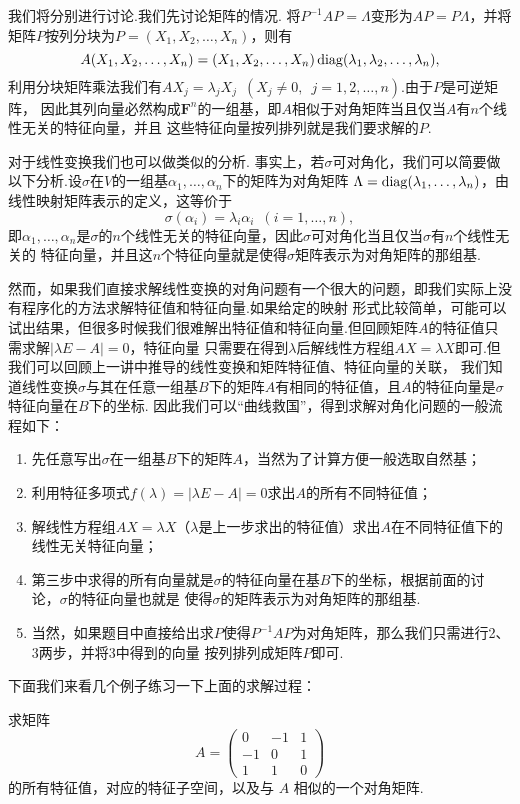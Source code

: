 我们将分别进行讨论.我们先讨论矩阵的情况.
将$P^{-1}AP=\Lambda$变形为$AP=P\Lambda$，并将矩阵$P$按列分块为$P=(X_1,X_2,\ldots,X_n)$，则有
\[A(X_1,X_2,\ldots,X_n)=(X_1,X_2,\ldots,X_n)\operatorname{diag}(\lambda_1,\lambda_2,\ldots,\lambda_n),\]
利用分块矩阵乘法我们有$AX_j=\lambda_jX_j\enspace(X_j\neq 0,\enspace j=1,2,\ldots,n)$.由于$P$是可逆矩阵，
因此其列向量必然构成$\mathbf{F}^n$的一组基，即$A$相似于对角矩阵当且仅当$A$有$n$个线性无关的特征向量，并且
这些特征向量按列排列就是我们要求解的$P$.

对于线性变换我们也可以做类似的分析.
事实上，若$\sigma$可对角化，我们可以简要做以下分析.设$\sigma$在$V$的一组基$\alpha_1,\ldots,\alpha_n$下的矩阵为对角矩阵
$\Lambda=\operatorname{diag}(\lambda_1,\ldots,\lambda_n)$，由线性映射矩阵表示的定义，这等价于
\[\sigma(\alpha_i)=\lambda_i\alpha_i\enspace(i=1,\ldots,n),\]
即$\alpha_1,\ldots,\alpha_n$是$\sigma$的$n$个线性无关的特征向量，因此$\sigma$可对角化当且仅当$\sigma$有$n$个线性无关的
特征向量，并且这$n$个特征向量就是使得$\sigma$矩阵表示为对角矩阵的那组基.

然而，如果我们直接求解线性变换的对角问题有一个很大的问题，即我们实际上没有程序化的方法求解特征值和特征向量.如果给定的映射
形式比较简单，可能可以试出结果，但很多时候我们很难解出特征值和特征向量.但回顾矩阵$A$的特征值只需求解$|\lambda E-A|=0$，特征向量
只需要在得到$\lambda$后解线性方程组$AX=\lambda X$即可.但我们可以回顾上一讲中推导的线性变换和矩阵特征值、特征向量的关联，
我们知道线性变换$\sigma$与其在任意一组基$B$下的矩阵$A$有相同的特征值，且$A$的特征向量是$\sigma$特征向量在$B$下的坐标.
因此我们可以``曲线救国''，得到求解对角化问题的一般流程如下：

\begin{enumerate}
    \item 先任意写出$\sigma$在一组基$B$下的矩阵$A$，当然为了计算方便一般选取自然基；
    \item 利用特征多项式$f(\lambda)=|\lambda E-A|=0$求出$A$的所有不同特征值；
    \item 解线性方程组$AX=\lambda X$（$\lambda$是上一步求出的特征值）求出$A$在不同特征值下的线性无关特征向量；
    \item 第三步中求得的所有向量就是$\sigma$的特征向量在基$B$下的坐标，根据前面的讨论，$\sigma$的特征向量也就是
    使得$\sigma$的矩阵表示为对角矩阵的那组基.
    \item 当然，如果题目中直接给出求$P$使得$P^{-1}AP$为对角矩阵，那么我们只需进行2、3两步，并将3中得到的向量
    按列排列成矩阵$P$即可.
\end{enumerate}

下面我们来看几个例子练习一下上面的求解过程：
\begin{example}
    求矩阵
    \[A=\begin{pmatrix}
        0 & -1 & 1 \\
        -1 & 0 & 1 \\
        1 & 1 & 0
    \end{pmatrix}\]
    的所有特征值，对应的特征子空间，以及与 $A$ 相似的一个对角矩阵.
\end{example}
\begin{solution}

\end{solution}

